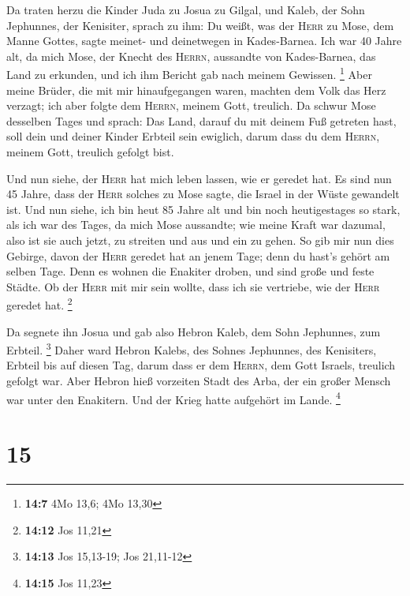  Da traten herzu die Kinder Juda zu Josua zu Gilgal, und
Kaleb, der Sohn Jephunnes, der Kenisiter, sprach zu ihm: Du weißt, was
der \textsc{Herr} zu Mose, dem Manne Gottes, sagte meinet- und
deinetwegen in Kades-Barnea.  Ich war 40 Jahre alt, da
mich Mose, der Knecht des \textsc{Herrn}, aussandte von Kades-Barnea,
das Land zu erkunden, und ich ihm Bericht gab nach meinem Gewissen.
\footnote{\textbf{14:7} 4Mo 13,6; 4Mo 13,30}  Aber meine
Brüder, die mit mir hinaufgegangen waren, machten dem Volk das Herz
verzagt; ich aber folgte dem \textsc{Herrn}, meinem Gott, treulich.
 Da schwur Mose desselben Tages und sprach: Das Land,
darauf du mit deinem Fuß getreten hast, soll dein und deiner Kinder
Erbteil sein ewiglich, darum dass du dem \textsc{Herrn}, meinem Gott,
treulich gefolgt bist.

 Und nun siehe, der \textsc{Herr} hat mich leben lassen,
wie er geredet hat. Es sind nun 45 Jahre, dass der \textsc{Herr} solches
zu Mose sagte, die Israel in der Wüste gewandelt ist. Und nun siehe, ich
bin heut 85 Jahre alt  und bin noch heutigestages so
stark, als ich war des Tages, da mich Mose aussandte; wie meine Kraft
war dazumal, also ist sie auch jetzt, zu streiten und aus und ein zu
gehen.  So gib mir nun dies Gebirge, davon der
\textsc{Herr} geredet hat an jenem Tage; denn du hast's gehört am selben
Tage. Denn es wohnen die Enakiter droben, und sind große und feste
Städte. Ob der \textsc{Herr} mit mir sein wollte, dass ich sie
vertriebe, wie der \textsc{Herr} geredet hat. \footnote{\textbf{14:12}
  Jos 11,21}

 Da segnete ihn Josua und gab also Hebron Kaleb, dem Sohn
Jephunnes, zum Erbteil. \footnote{\textbf{14:13} Jos 15,13-19; Jos
  21,11-12}  Daher ward Hebron Kalebs, des Sohnes
Jephunnes, des Kenisiters, Erbteil bis auf diesen Tag, darum dass er dem
\textsc{Herrn}, dem Gott Israels, treulich gefolgt war. 
Aber Hebron hieß vorzeiten Stadt des Arba, der ein großer Mensch war
unter den Enakitern. Und der Krieg hatte aufgehört im Lande. \footnote{\textbf{14:15}
  Jos 11,23}

\hypertarget{section-6}{%
\section{15}\label{section-6}}


